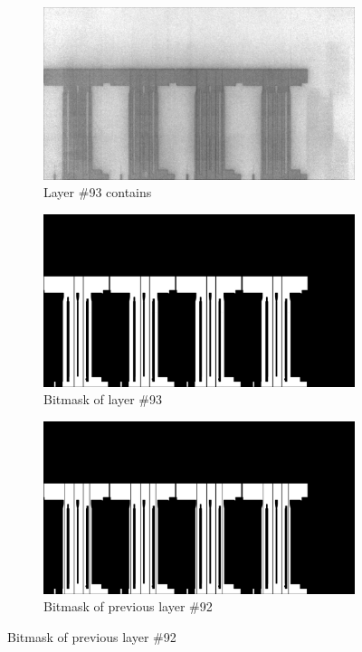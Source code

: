 
\begin{figure}[!h]
  \centering
  \begin{subfigure}{.8\textwidth}
    \centering
    \includegraphics[width=\linewidth]{images/implementation/results/bm/layer_00093}
    \caption{Layer \#93 contains}
  \end{subfigure}

  \begin{subfigure}{.8\textwidth}
    \centering
    \includegraphics[width=\linewidth]{images/implementation/results/bm/bitmask_00093}
    \caption{Bitmask of layer \#93}
  \end{subfigure}

  \begin{subfigure}{.8\textwidth}
    \centering
    \includegraphics[width=\linewidth]{images/implementation/results/bm/bitmask_00092}
    \caption{Bitmask of previous layer \#92}
  \end{subfigure}


\end{figure}
